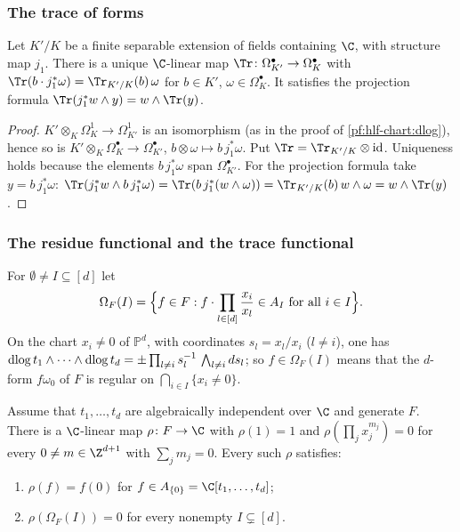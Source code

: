 \subsubsection*{The trace of forms}

\begin{lemma}\label{pf:hlf-chart:trdr}
Let $K'/K$ be a finite separable extension of fields containing $\C$, with structure map $j_1$. There is a unique $\C$-linear map
$\Tr\colon\Omega^\bullet_{K'}\to\Omega^\bullet_K$ with $\Tr(b\cdot j_1^*\omega)=\Tr_{K'/K}(b)\,\omega$ for $b\in K'$, $\omega\in\Omega^\bullet_K$.
It satisfies the projection formula $\Tr(j_1^*w\wedge y)=w\wedge\Tr(y)$.
\end{lemma}

\begin{proof}
$K'\otimes_K\Omega^1_K\to\Omega^1_{K'}$ is an isomorphism (as in the proof of \cref{pf:hlf-chart:dlog}), hence so is
$K'\otimes_K\Omega^\bullet_K\to\Omega^\bullet_{K'}$, $b\otimes\omega\mapsto b\,j_1^*\omega$. Put $\Tr=\Tr_{K'/K}\otimes\mathrm{id}$. Uniqueness holds because
the elements $b\,j_1^*\omega$ span $\Omega^\bullet_{K'}$. For the projection formula take $y=b\,j_1^*\omega$:
$\Tr(j_1^*w\wedge b\,j_1^*\omega)=\Tr(b\,j_1^*(w\wedge\omega))=\Tr_{K'/K}(b)\,w\wedge\omega=w\wedge\Tr(y)$.
\end{proof}

\subsubsection*{The residue functional and the trace functional}
For $\emptyset\ne I\subseteq[d]$ let
\[
  \Omega_F(I)=\Bigl\{f\in F : f\cdot\prod_{l\in[d]}\frac{x_i}{x_l}\in A_I\ \text{for all }i\in I\Bigr\}.
\]
On the chart $x_i\ne0$ of $\mathbb P^d$, with coordinates $s_l=x_l/x_i$ ($l\ne i$), one has
$\operatorname{dlog} t_1\wedge\dots\wedge\operatorname{dlog} t_d=\pm\prod_{l\ne i}s_l^{-1}\,\bigwedge_{l\ne i}ds_l$; so $f\in\Omega_F(I)$ means that the $d$-form
$f\omega_0$ of $F$ is regular on $\bigcap_{i\in I}\{x_i\ne0\}$.

\begin{lemma}\label{pf:hlf-chart:rho}
Assume that $t_1,\dots,t_d$ are algebraically independent over $\C$ and generate $F$. There is a $\C$-linear map $\rho\colon F\to\C$ with
$\rho(1)=1$ and $\rho(\prod_jx_j^{m_j})=0$ for every $0\ne m\in\Z^{d+1}$ with $\sum_jm_j=0$. Every such $\rho$ satisfies:
\begin{enumerate}[label=\textup{(\alph*)},nosep]
\item $\rho(f)=f(0)$ for $f\in A_{\{0\}}=\C[t_1,\dots,t_d]$;
\item $\rho(\Omega_F(I))=0$ for every nonempty $I\subsetneq[d]$.
\end{enumerate}
\end{lemma}

